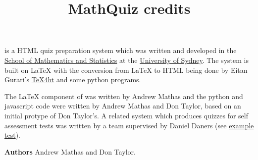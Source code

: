 \documentclass{mathquiz}
\title{MathQuiz credits}
\begin{document}
\begin{discussion}[Credits]
  \MathQuiz{} is a HTML quiz preparation system which was written and
   developed in the
  \href{http://www.maths.usyd.edu.au/}{School of Mathematics and Statistics}
   at the
   \href{http://www.usyd.edu.au/}{University of Sydney}. The system is built on
   \LaTeX{} with the conversion from \LaTeX{} to HTML being done by
   Eitan Gurari's
  \href{http://www.cis.ohio-state.edu/~gurari/TeX4ht/mn.html}{TeX4ht}
    and some python programs.

    \quad\newline
   The \LaTeX{} component of \MathQuiz{} was written by Andrew Mathas and the python
   and javascript code were written by Andrew Mathas and Don Taylor, based on an
   initial protype of Don Taylor's. A related system which produces quizzes for self
   assessment tests was written by a team supervised by Daniel Daners (see
   \href{http://www.maths.usyd.edu.au:8000/us/selftest.cgi}{example test}).

   \quad\newline

    \textbf{Authors}\newline
    Andrew Mathas and Don Taylor.
\end{discussion}
\end{document}
